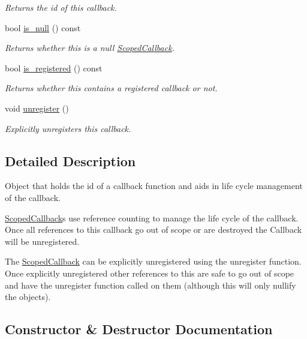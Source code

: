 \begin{DoxyCompactItemize}
\begin{DoxyCompactList}\small\item\em Returns the id of this callback. \end{DoxyCompactList}\item 
bool \hyperlink{classsigma_1_1core_1_1_scoped_callback_a2e2737f20e405f06f5d5a640c5746d70}{is\+\_\+null} () const 
\begin{DoxyCompactList}\small\item\em Returns whether this is a null \hyperlink{classsigma_1_1core_1_1_scoped_callback}{Scoped\+Callback}. \end{DoxyCompactList}\item 
bool \hyperlink{classsigma_1_1core_1_1_scoped_callback_adafe2e52e653bca84d11f1d0baaec616}{is\+\_\+registered} () const 
\begin{DoxyCompactList}\small\item\em Returns whether this contains a registered callback or not. \end{DoxyCompactList}\item 
void \hyperlink{classsigma_1_1core_1_1_scoped_callback_ad8d8ea4671f58077c8f9ef020e52e125}{unregister} ()
\begin{DoxyCompactList}\small\item\em Explicitly unregisters this callback. \end{DoxyCompactList}\end{DoxyCompactItemize}


\subsection{Detailed Description}
Object that holds the id of a callback function and aids in life cycle management of the callback. 

\hyperlink{classsigma_1_1core_1_1_scoped_callback}{Scoped\+Callback}\textquotesingle{}s use reference counting to manage the life cycle of the callback. Once all references to this callback go out of scope or are destroyed the Callback will be unregistered.

The \hyperlink{classsigma_1_1core_1_1_scoped_callback}{Scoped\+Callback} can be explicitly unregistered using the {\ttfamily unregister} function. Once explicitly unregistered other references to this are safe to go out of scope and have the {\ttfamily unregister} function called on them (although this will only nullify the objects). 

\subsection{Constructor \& Destructor Documentation}
\hypertarget{classsigma_1_1core_1_1_scoped_callback_ab7d6ecc53f4f2ae5c099aa432ca5fe46}{}
